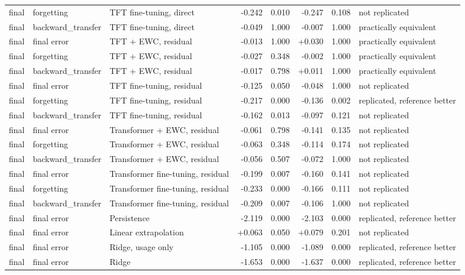 \begin{table}[t]
\begin{tabular}{lllrrrrl}
    final & forgetting & TFT fine-tuning, direct & -0.242 & 0.010 & -0.247 & 0.108 & not replicated \\
    final & backward\_transfer & TFT fine-tuning, direct & -0.049 & 1.000 & -0.007 & 1.000 & practically equivalent \\
    final & final error & TFT + EWC, residual & -0.013 & 1.000 & +0.030 & 1.000 & practically equivalent \\
    final & forgetting & TFT + EWC, residual & -0.027 & 0.348 & -0.002 & 1.000 & practically equivalent \\
    final & backward\_transfer & TFT + EWC, residual & -0.017 & 0.798 & +0.011 & 1.000 & practically equivalent \\
    final & final error & TFT fine-tuning, residual & -0.125 & 0.050 & -0.048 & 1.000 & not replicated \\
    final & forgetting & TFT fine-tuning, residual & -0.217 & 0.000 & -0.136 & 0.002 & replicated, reference better \\
    final & backward\_transfer & TFT fine-tuning, residual & -0.162 & 0.013 & -0.097 & 0.121 & not replicated \\
    final & final error & Transformer + EWC, residual & -0.061 & 0.798 & -0.141 & 0.135 & not replicated \\
    final & forgetting & Transformer + EWC, residual & -0.063 & 0.348 & -0.114 & 0.174 & not replicated \\
    final & backward\_transfer & Transformer + EWC, residual & -0.056 & 0.507 & -0.072 & 1.000 & not replicated \\
    final & final error & Transformer fine-tuning, residual & -0.199 & 0.007 & -0.160 & 0.141 & not replicated \\
    final & forgetting & Transformer fine-tuning, residual & -0.233 & 0.000 & -0.166 & 0.111 & not replicated \\
    final & backward\_transfer & Transformer fine-tuning, residual & -0.209 & 0.007 & -0.106 & 1.000 & not replicated \\
    final & final error & Persistence & -2.119 & 0.000 & -2.103 & 0.000 & replicated, reference better \\
    final & final error & Linear extrapolation & +0.063 & 0.050 & +0.079 & 0.201 & not replicated \\
    final & final error & Ridge, usage only & -1.105 & 0.000 & -1.089 & 0.000 & replicated, reference better \\
    final & final error & Ridge & -1.653 & 0.000 & -1.637 & 0.000 & replicated, reference better \\

\end{tabular}
\end{table}
